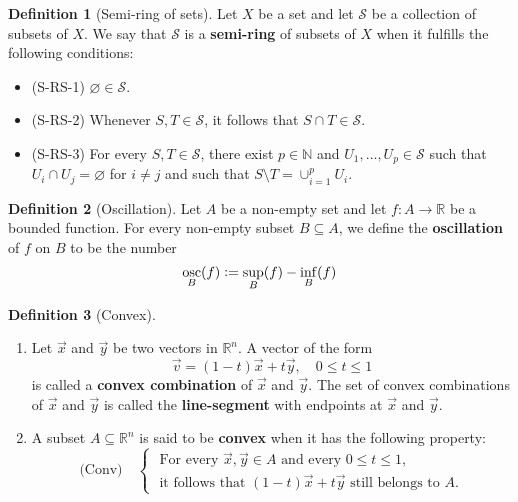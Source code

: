 \documentclass[11pt]{article}
\theoremstyle{definition}
\newtheorem*{defn*}{Definition}
\newcommand{\N}{\ensuremath{\mathbb{N}}}
\newcommand{\R}{\ensuremath{\mathbb{R}}}
\begin{document}
\begin{defn*}[Semi-ring of sets]
Let $X$ be a set and let $\mathcal{S}$ be a collection of subsets of $X$. We say that $\mathcal{S}$ is a {\bf semi-ring} of subsets of $X$ when it fulfills the following conditions:
\vspace{-1.5ex}\begin{itemize}[label={}]
    \item (S-RS-1) \; $\varnothing \in \mathcal{S}$.
    \item (S-RS-2) \; Whenever $S, T \in \mathcal{S}$, it follows that $S \cap T \in \mathcal{S}$.
    \item (S-RS-3) \; For every $S, T \in \mathcal{S}$, there exist $p \in \N$ and $U_1, \dots, U_p \in \mathcal{S}$ such that $U_i \cap U_j = \varnothing$ for $i \neq j$ and such that $S \setminus T = \cup_{i=1}^p U_i$.
\end{itemize}\vspace{-1.5ex}
\end{defn*}

\begin{defn*}[Oscillation]
Let $A$ be a non-empty set and let $f : A \to \R$ be a bounded function. For every non-empty subset $B \subseteq A$, we define the {\bf oscillation} of $f$ on $B$ to be the number
$$\underset{B}{\rm osc}(f) := \sup_B(f) - \inf_B(f)$$
\end{defn*}

\begin{defn*}[Convex]~\vspace{-1.5ex}
\begin{enumerate}[(1)]
\item Let $\vec{x}$ and $\vec{y}$ be two vectors in $\R^n$. A vector of the form
$$\vec{v} = (1-t)\vec{x} + t\vec{y}, \quad 0 \leq t \leq 1$$
is called a {\bf convex combination} of $\vec{x}$ and $\vec{y}$. The set of convex combinations of $\vec{x}$ and $\vec{y}$ is called the {\bf line-segment} with endpoints at $\vec{x}$ and $\vec{y}$.
\item A subset $A \subseteq \R^n$ is said to be {\bf convex} when it has the following property:
\[ \text{(Conv)} \quad \begin{cases} \text{ For every $\vec{x}, \vec{y} \in A$ and every $0 \leq t \leq 1$,} \\ \text{ it follows that $(1-t)\vec{x} + t\vec{y}$ still belongs to $A$.} \end{cases} \]
\end{enumerate}\vspace{-1.5ex}
\end{defn*}
\end{document}
